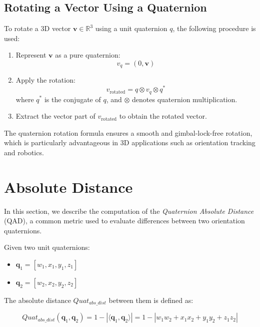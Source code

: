 \documentclass{iutbscthesis}
\begin{document}
\begin{appendices}
\subsection{Rotating a Vector Using a Quaternion} \label{subsec:rotatevector}

To rotate a 3D vector $\mathbf{v} \in \mathbb{R}^3$ using a unit quaternion $q$, the following procedure is used:

\begin{enumerate}
    \item Represent $\mathbf{v}$ as a pure quaternion:
    \[
    v_q = (0, \mathbf{v})
    \]
    
    \item Apply the rotation:
    \[
    v_{\text{rotated}} = q \otimes v_q \otimes q^*
    \]
    where $q^*$ is the conjugate of $q$, and $\otimes$ denotes quaternion multiplication.
    
    \item Extract the vector part of $v_{\text{rotated}}$ to obtain the rotated vector.
\end{enumerate}

The quaternion rotation formula ensures a smooth and gimbal-lock-free rotation, which is particularly advantageous in 3D applications such as orientation tracking and robotics.


\section{Absolute Distance} \label{appendix:quaternion-distance}
In this section, we describe the computation of the \textit{Quaternion Absolute Distance} (QAD), a common metric used to evaluate differences between two orientation quaternions.

Given two unit quaternions:
\begin{itemize}
    \item $\mathbf{q}_1 = [w_1, x_1, y_1, z_1]$
    \item $\mathbf{q}_2 = [w_2, x_2, y_2, z_2]$
\end{itemize}

The absolute distance $Quat_{abs\_dist}$ between them is defined as:

\begin{equation}
    Quat_{abs\_dist}(\mathbf{q}_1, \mathbf{q}_2) = 1 - \left| \langle \mathbf{q}_1, \mathbf{q}_2 \rangle \right| = 1 - \left| w_1 w_2 + x_1 x_2 + y_1 y_2 + z_1 z_2 \right|
\end{equation}


\end{appendices}
\end{document}
